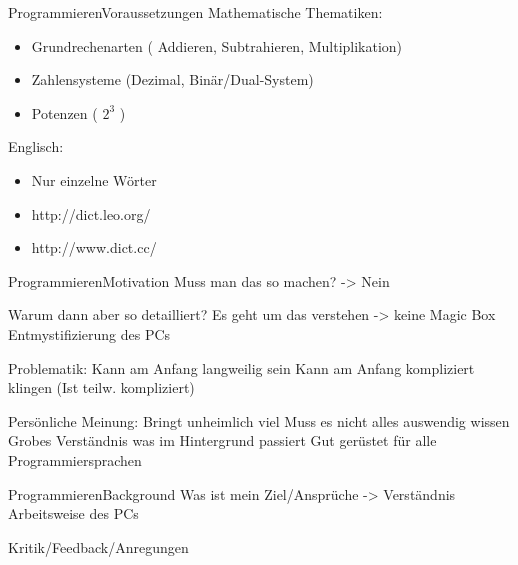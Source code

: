 \begin{frame}{Programmieren}{Voraussetzungen}
	Mathematische Thematiken:
	\begin{itemize}
	\item Grundrechenarten ( Addieren, Subtrahieren, Multiplikation)
	\item Zahlensysteme (Dezimal, Binär/Dual-System)
	\item Potenzen ( $2^3$ )
	\end{itemize}
	
	
	Englisch:
	\begin{itemize}
	\item Nur einzelne Wörter
	\item http://dict.leo.org/
	\item http://www.dict.cc/
	\end{itemize}	
\end{frame}


\begin{frame}{Programmieren}{Motivation}
	Muss man das so machen?
		-> Nein
	
	Warum dann aber so detailliert?
		Es geht um das verstehen -> keine Magic Box
		Entmystifizierung des PCs
	
	Problematik:
		Kann am Anfang langweilig sein
		Kann am Anfang kompliziert klingen
			(Ist teilw. kompliziert)
	
	Persönliche Meinung:
		Bringt unheimlich viel
		Muss es nicht alles auswendig wissen
		Grobes Verständnis was im Hintergrund passiert
		Gut gerüstet für alle Programmiersprachen
	
\end{frame}


\begin{frame}{Programmieren}{Background}
	Was ist mein Ziel/Ansprüche
		-> Verständnis Arbeitsweise des PCs
	
	Kritik/Feedback/Anregungen
	
\end{frame}
